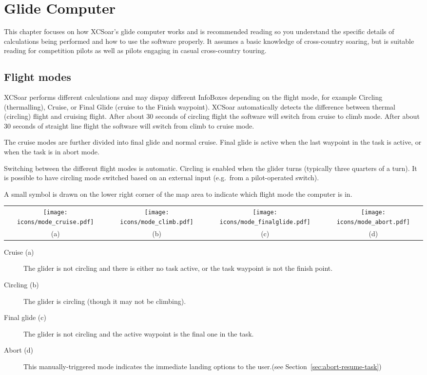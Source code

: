 \chapter{Glide Computer}\label{cha:glide}
This chapter focuses on how XCSoar's glide computer works and is
recommended reading so you understand the specific details of
calculations being performed and how to use the software properly.  It
assumes a basic knowledge of cross-country soaring, but is suitable
reading for competition pilots as well as pilots engaging in casual
cross-country touring.

\section{Flight modes} 
XCSoar performs different calculations and may dispay different
InfoBoxes depending on the flight mode, for example Circling
(thermalling), Cruise, or Final Glide (cruise to the Finish waypoint).
XCSoar automatically detects the difference between thermal (circling)
flight and cruising flight. After about 30 seconds of circling flight
the software will switch from cruise to climb mode. After about 30
seconds of straight line flight the software will switch from climb to
cruise mode.

The cruise modes are further divided into final glide and normal
cruise.  Final glide is active when the last waypoint in the task is
active, or when the task is in abort mode.

Switching between the different flight modes is automatic.  Circling
is enabled when the glider turns (typically three quarters of a turn).
It is possible to have circling mode switched based on an external
input (e.g.\ from a pilot-operated switch).

A small symbol is drawn on the lower right corner of the map area to
indicate which flight mode the computer is in.

\begin{tabular}{c c c c}%
\texttt{[image: icons/mode\_cruise.pdf]} &
\texttt{[image: icons/mode\_climb.pdf]} &
\texttt{[image: icons/mode\_finalglide.pdf]} &
\texttt{[image: icons/mode\_abort.pdf]}\\
(a) & (b) & (c) & (d)
\end{tabular}

\begin{description}
\item[Cruise (a)]   The glider is not circling and there is either no task
  active, or the task waypoint is not the finish point.
\item[Circling (b)]  The glider is circling (though it may not be climbing).
\item[Final glide (c)]  The glider is not circling and the active waypoint is the
 final one in the task.
\item[Abort (d)]  This manually-triggered mode indicates the immediate landing
options to the user.(see Section~\ref{sec:abort-resume-task})
\end{description}

